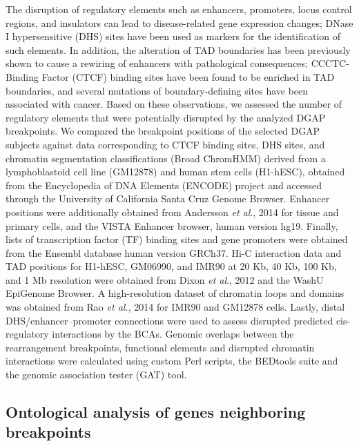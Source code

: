 \documentclass[a4paper,twoside=true,openright,parskip=full,chapterprefix=true,11pt,headings=normal,bibliography=totoc,listof=totoc,titlepage=on,captions=tableabove,draft=false]{scrreprt}
\theoremstyle{definition}
\theoremstyle{definition}
\theoremstyle{definition}
\theoremstyle{remark}
\begin{document}
The disruption of regulatory elements such as enhancers, promoters,
locus control regions, and insulators can lead to disease-related gene
expression changes; DNase I hypersensitive (DHS) sites have been used as
markers for the identification of such elements.\citep{Thurman2012} In
addition, the alteration of TAD boundaries has been previously shown to
cause a rewiring of enhancers with pathological
consequences;\citep{Lupianez2015, Giorgio2015, Narendra2015}
CCCTC-Binding Factor (CTCF) binding sites have been found to be enriched
in TAD boundaries,\citep{Dixon2012} and several mutations of
boundary-defining sites have been associated with
cancer.\citep{Flavahan2016, Hnisz2016} Based on these observations, we
assessed the number of regulatory elements that were potentially
disrupted by the analyzed DGAP breakpoints. We compared the breakpoint
positions of the selected DGAP subjects against data corresponding to
CTCF binding sites, DHS sites, and chromatin segmentation
classifications (Broad ChromHMM) derived from a lymphoblastoid cell line
(GM12878) and human stem cells (H1-hESC), obtained from the Encyclopedia
of DNA Elements (ENCODE) project\citep{Dunham2012} and accessed through
the University of California Santa Cruz Genome Browser.\citep{Kent2002}
Enhancer positions were additionally obtained from Andersson \emph{et
al}., 2014\citep{Andersson2014} for tissue and primary cells, and the
VISTA Enhancer browser, human version hg19.\citep{Visel2007} Finally,
lists of transcription factor (TF) binding sites and gene promoters were
obtained from the Ensembl database human version
GRCh37.\citep{Flicek2014} Hi-C interaction data and TAD positions for
H1-hESC, GM06990, and IMR90 at 20 Kb, 40 Kb, 100 Kb, and 1 Mb resolution
were obtained from Dixon \emph{et al}., 2012\citep{Dixon2012} and the
WashU EpiGenome Browser.\citep{Zhou2012} A high-resolution dataset of
chromatin loops and domains was obtained from Rao \emph{et al.}, 2014
for IMR90 and GM12878 cells.\citep{Rao2014} Lastly, distal
DHS/enhancer--promoter connections\citep{Thurman2012} were used to
assess disrupted predicted cis-regulatory interactions by the BCAs.
Genomic overlaps between the rearrangement breakpoints, functional
elements and disrupted chromatin interactions were calculated using
custom Perl scripts, the BEDtools suite\citep{Quinlan2010} and the
genomic association tester (GAT) tool.\citep{Heger2013}

\hypertarget{ontological-analysis-of-genes-neighboring-breakpoints}{%
\subsection{Ontological analysis of genes neighboring
breakpoints}\label{ontological-analysis-of-genes-neighboring-breakpoints}}
\end{document}

